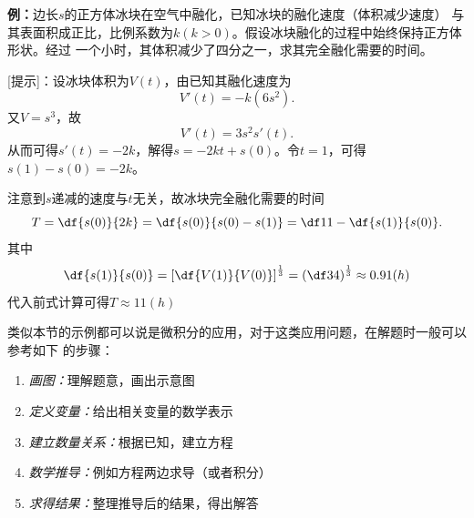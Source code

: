{\bf 例：}边长$s$的正方体冰块在空气中融化，已知冰块的融化速度（体积减少速度）
与其表面积成正比，比例系数为$k(k>0)$。假设冰块融化的过程中始终保持正方体形状。经过
一个小时，其体积减少了四分之一，求其完全融化需要的时间。

[提示]：设冰块体积为$V(t)$，由已知其融化速度为
$$V'(t)=-k(6s^2).$$
又$V=s^3$，故
$$V'(t)=3s^2s'(t).$$
从而可得$s'(t)=-2k$，解得$s=-2kt+s(0)$。令$t=1$，可得$s(1)-s(0)=-2k$。

注意到$s$递减的速度与$t$无关，故冰块完全融化需要的时间
$$T=\df{s(0)}{2k}=\df{s(0)}{s(0)-s(1)}=\df1{1-\df{s(1)}{s(0)}}.$$
其中
$$\df{s(1)}{s(0)}=\left[\df{V(1)}{V(0)}\right]^{\frac13}=
\left(\df34\right)^{\frac13}\approx0.91(h)$$
代入前式计算可得$T\approx11(h)$

类似本节的示例都可以说是微积分的应用，对于这类应用问题，在解题时一般可以参考如下
的步骤：
\begin{enumerate}
  \setlength{\itemindent}{1cm}
  \item {{\it 画图：}}理解题意，画出示意图
  \item {{\it 定义变量：}}给出相关变量的数学表示
  \item {{\it 建立数量关系：}}根据已知，建立方程
  \item {{\it 数学推导：}}例如方程两边求导（或者积分）
  \item {{\it 求得结果：}}整理推导后的结果，得出解答
\end{enumerate}

